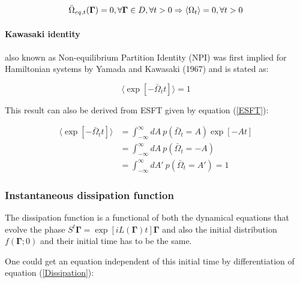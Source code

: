 \documentclass[a4paper,12pt,nofootinbib]{article}
\begin{document}
\begin{equation}
  \bar{\Omega}_{eq,t}(\bm{\Gamma})=0, \forall\bm{\Gamma}\in  D, \forall t >0 \\
  \Rightarrow \langle \Omega_t \rangle = 0, \forall t > 0
\end{equation}


\paragraph{Kawasaki identity}

also known as Non-equilibrium Partition Identity (NPI) was first implied for Hamiltonian systems by Yamada and Kawasaki (1967) \cite{Anonymous:1967fr} and is stated as:

\begin{equation}
  \langle \exp[-\bar{\Omega}_t t] \rangle =1
\end{equation}

This result can also be derived from ESFT given by equation (\ref{ESFT}):

\begin{equation}
\begin{aligned}
  \langle \exp[-\bar{\Omega}_t t] \rangle &= \int_{-\infty}^{\infty} dA\ p(\bar{\Omega}_t=A)\exp[-A t]\\
  &=\int_{-\infty}^{\infty} dA\ p(\bar{\Omega}_t=-A)\\
  &=\int_{-\infty}^{\infty} dA'\ p(\bar{\Omega}_t=A')=1
\end{aligned}
\end{equation}


\subsubsection{Instantaneous dissipation function}

The dissipation function is a functional of both the dynamical equations that evolve the phase $S^t \bm{\Gamma} = \exp[iL(\bm{\Gamma})t]\bm{\Gamma}$ and also the initial distribution $f(\bm{\Gamma};0)$ and their initial time has to be the same.

One could get an equation independent of this initial time by differentiation of equation (\ref{Dissipation}):
\end{document}
